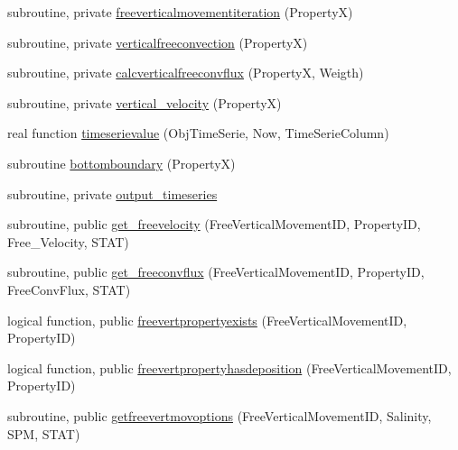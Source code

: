\begin{DoxyCompactItemize}
\item 
subroutine, private \mbox{\hyperlink{namespacemodulefreeverticalmovement_ac736b639239aa370175df19fc8836c97}{freeverticalmovementiteration}} (PropertyX)
\item 
subroutine, private \mbox{\hyperlink{namespacemodulefreeverticalmovement_a31ae6c338b4621e00f2dd8c66bb9268f}{verticalfreeconvection}} (PropertyX)
\item 
subroutine, private \mbox{\hyperlink{namespacemodulefreeverticalmovement_a42b3411647c7bb8c92b023c61a0c49cc}{calcverticalfreeconvflux}} (PropertyX, Weigth)
\item 
subroutine, private \mbox{\hyperlink{namespacemodulefreeverticalmovement_ab6e298fcea3ea467957f90a97c8032df}{vertical\+\_\+velocity}} (PropertyX)
\item 
real function \mbox{\hyperlink{namespacemodulefreeverticalmovement_a543eec774fcc212b6cb45cb2eb05b988}{timeserievalue}} (Obj\+Time\+Serie, Now, Time\+Serie\+Column)
\item 
subroutine \mbox{\hyperlink{namespacemodulefreeverticalmovement_ad4e1681fa973f2a527c8fb380ad6fa31}{bottomboundary}} (PropertyX)
\item 
subroutine, private \mbox{\hyperlink{namespacemodulefreeverticalmovement_a074424b5e6d0b4d4588c869805dbf784}{output\+\_\+timeseries}}
\item 
subroutine, public \mbox{\hyperlink{namespacemodulefreeverticalmovement_ae1df1a4ce293addb56cc6c44759de660}{get\+\_\+freevelocity}} (Free\+Vertical\+Movement\+ID, Property\+ID, Free\+\_\+\+Velocity, S\+T\+AT)
\item 
subroutine, public \mbox{\hyperlink{namespacemodulefreeverticalmovement_ae2c2c24a260e587fdae043cc60422788}{get\+\_\+freeconvflux}} (Free\+Vertical\+Movement\+ID, Property\+ID, Free\+Conv\+Flux, S\+T\+AT)
\item 
logical function, public \mbox{\hyperlink{namespacemodulefreeverticalmovement_abe59234b027e4daf4dad54daa42f5438}{freevertpropertyexists}} (Free\+Vertical\+Movement\+ID, Property\+ID)
\item 
logical function, public \mbox{\hyperlink{namespacemodulefreeverticalmovement_a5df00d9a684664131c8c007872e866a8}{freevertpropertyhasdeposition}} (Free\+Vertical\+Movement\+ID, Property\+ID)
\item 
subroutine, public \mbox{\hyperlink{namespacemodulefreeverticalmovement_aeb0cb26f03549d5f06df5b4559b58017}{getfreevertmovoptions}} (Free\+Vertical\+Movement\+ID, Salinity, S\+PM, S\+T\+AT)
\item 

\end{DoxyCompactItemize}
